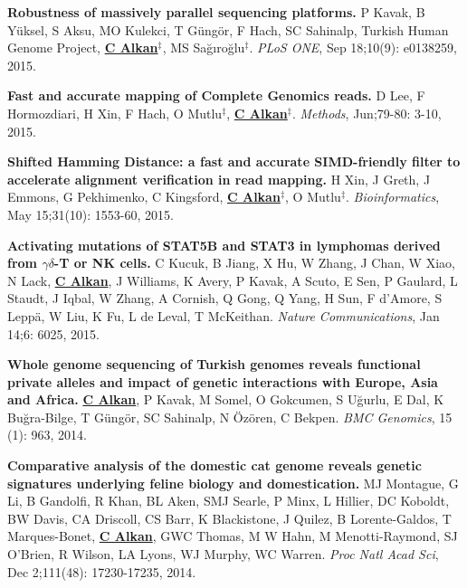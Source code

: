   \vspace{-.2cm}        
  {\bf Robustness of massively parallel sequencing platforms.}
  P Kavak, B Yüksel, S Aksu, MO Kulekci, T Güngör, F Hach, SC Sahinalp, Turkish Human Genome Project, {\bf {\underline {C Alkan}}}$^\ddag$,
  MS Sağıroğlu$^\ddag$.    
  {\em PLoS ONE},  Sep 18;10(9): e0138259, 2015.  


  \vspace{-.2cm}        
  {\bf Fast and accurate mapping of Complete Genomics reads.}
  D Lee, F Hormozdiari, H Xin, F Hach, O Mutlu$^\ddag$,  {\bf {\underline {C Alkan}}}$^\ddag$.
  {\em Methods}, Jun;79-80: 3-10, 2015. 

  \vspace{-.2cm}        
  {\bf Shifted Hamming Distance: a fast and accurate SIMD-friendly filter to accelerate alignment verification in read mapping.} H Xin, J Greth, J Emmons, 
G Pekhimenko, C Kingsford, {\bf {\underline{C Alkan}}}$^\ddag$,  O Mutlu$^\ddag$. {\em Bioinformatics},  May 15;31(10): 1553-60, 2015.



  \vspace{-.2cm}        
  {\bf Activating mutations of STAT5B and STAT3 in lymphomas derived from $\gamma\delta$-T or NK cells.}
   C Kucuk, B Jiang, X Hu, W Zhang, J Chan, W Xiao, N Lack,   {\bf {\underline {C Alkan}}},  J Williams, K Avery, P Kavak, A Scuto, E Sen,  P Gaulard, L Staudt, J Iqbal,  W Zhang,  A Cornish, Q Gong, Q  Yang, H Sun, F d'Amore, S Leppä, W Liu, K Fu, L de Leval, T McKeithan.
 {\em Nature Communications}, Jan 14;6: 6025, 2015.


  \vspace{-.2cm}        
  {\bf Whole genome sequencing of Turkish genomes reveals functional private alleles and impact of genetic interactions with Europe, Asia and Africa.}
  {\bf {\underline {C Alkan}}}, P Kavak, M Somel, O Gokcumen, S Uğurlu, E Dal, K Buğra-Bilge,  T Güngör, SC Sahinalp, N Özören, C Bekpen.
  {\em BMC Genomics}, 15 (1): 963, 2014.

\clearpage

  \vspace{-.2cm}        
  {\bf Comparative analysis of the domestic cat genome reveals genetic signatures underlying feline biology and domestication.}
  MJ Montague, G Li, B Gandolfi, R Khan, BL Aken, SMJ Searle, P Minx, L Hillier, DC Koboldt, BW Davis, CA Driscoll, 
  CS Barr, K Blackistone, J Quilez, B Lorente-Galdos, T Marques-Bonet, {\bf {\underline {C Alkan}}}, GWC Thomas, M W Hahn, M Menotti-Raymond, 
  SJ O’Brien, R Wilson, LA Lyons, WJ Murphy, WC Warren. {\em Proc Natl Acad Sci}, Dec 2;111(48): 17230-17235, 2014.

